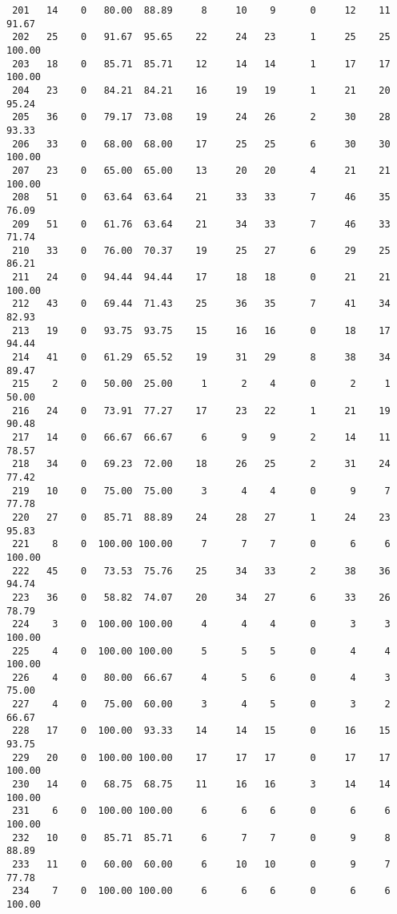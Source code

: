 \begin{verbatim}
 201   14    0   80.00  88.89     8     10    9      0     12    11    91.67
 202   25    0   91.67  95.65    22     24   23      1     25    25   100.00
 203   18    0   85.71  85.71    12     14   14      1     17    17   100.00
 204   23    0   84.21  84.21    16     19   19      1     21    20    95.24
 205   36    0   79.17  73.08    19     24   26      2     30    28    93.33
 206   33    0   68.00  68.00    17     25   25      6     30    30   100.00
 207   23    0   65.00  65.00    13     20   20      4     21    21   100.00
 208   51    0   63.64  63.64    21     33   33      7     46    35    76.09
 209   51    0   61.76  63.64    21     34   33      7     46    33    71.74
 210   33    0   76.00  70.37    19     25   27      6     29    25    86.21
 211   24    0   94.44  94.44    17     18   18      0     21    21   100.00
 212   43    0   69.44  71.43    25     36   35      7     41    34    82.93
 213   19    0   93.75  93.75    15     16   16      0     18    17    94.44
 214   41    0   61.29  65.52    19     31   29      8     38    34    89.47
 215    2    0   50.00  25.00     1      2    4      0      2     1    50.00
 216   24    0   73.91  77.27    17     23   22      1     21    19    90.48
 217   14    0   66.67  66.67     6      9    9      2     14    11    78.57
 218   34    0   69.23  72.00    18     26   25      2     31    24    77.42
 219   10    0   75.00  75.00     3      4    4      0      9     7    77.78
 220   27    0   85.71  88.89    24     28   27      1     24    23    95.83
 221    8    0  100.00 100.00     7      7    7      0      6     6   100.00
 222   45    0   73.53  75.76    25     34   33      2     38    36    94.74
 223   36    0   58.82  74.07    20     34   27      6     33    26    78.79
 224    3    0  100.00 100.00     4      4    4      0      3     3   100.00
 225    4    0  100.00 100.00     5      5    5      0      4     4   100.00
 226    4    0   80.00  66.67     4      5    6      0      4     3    75.00
 227    4    0   75.00  60.00     3      4    5      0      3     2    66.67
 228   17    0  100.00  93.33    14     14   15      0     16    15    93.75
 229   20    0  100.00 100.00    17     17   17      0     17    17   100.00
 230   14    0   68.75  68.75    11     16   16      3     14    14   100.00
 231    6    0  100.00 100.00     6      6    6      0      6     6   100.00
 232   10    0   85.71  85.71     6      7    7      0      9     8    88.89
 233   11    0   60.00  60.00     6     10   10      0      9     7    77.78
 234    7    0  100.00 100.00     6      6    6      0      6     6   100.00

\end{verbatim}
